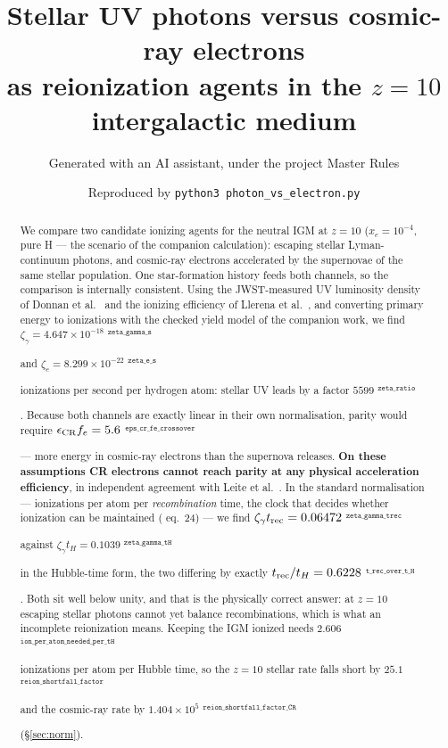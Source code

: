 \documentclass[11pt,a4paper]{article}
\title{Stellar UV photons versus cosmic-ray electrons\\
\large as reionization agents in the $z=10$ intergalactic medium}
\author{Generated with an AI assistant, under the project Master Rules}
\date{Reproduced by \texttt{python3 photon\_vs\_electron.py}}
\newif\ifprovdraft
\newcommand{\src}[1]{%
  \ifprovdraft
    \ifmmode{}^{\text{\color{gray}\scriptsize\texttt{#1}}}%
    \else{\color{gray}\scriptsize$^{\texttt{#1}}$}%
    \fi
  \fi}
\begin{document}
\maketitle

\begin{abstract}
\noindent
We compare two candidate ionizing agents for the neutral IGM at $z=10$
($x_e = 10^{-4}$, pure H --- the scenario of the companion calculation): escaping
stellar Lyman-continuum photons, and cosmic-ray electrons accelerated by the
supernovae of the same stellar population. One star-formation history feeds both
channels, so the comparison is internally consistent. Using the JWST-measured UV
luminosity density of Donnan et al.~\cite{donnan24} and the ionizing efficiency of
Llerena et al.~\cite{llerena25}, and converting primary energy to ionizations with
the checked yield model of the companion work, we find
$\zeta_\gamma = 4.647\times10^{-18}$\src{zeta\_gamma\_s} and
$\zeta_e = 8.299\times10^{-22}$\src{zeta\_e\_s} ionizations per second per
hydrogen atom: stellar UV leads by a factor
$5599$\src{zeta\_ratio}. Because both channels are exactly linear in their own
normalisation, parity would require
$\epsilon_{\rm CR}f_e = 5.6$\src{eps\_cr\_fe\_crossover} --- more energy in
cosmic-ray electrons than the supernova releases. \textbf{On these assumptions CR
electrons cannot reach parity at any physical acceleration efficiency}, in
independent agreement with Leite et al.~\cite{leite17}. In the standard
normalisation --- ionizations per atom per \emph{recombination} time, the clock
that decides whether ionization can be maintained (\cite{md14} eq.~24) --- we
find $\zeta_\gamma t_{\rm rec} = 0.06472$\src{zeta\_gamma\_trec} against
$\zeta_\gamma t_H = 0.1039$\src{zeta\_gamma\_tH} in the Hubble-time form, the two
differing by exactly $t_{\rm rec}/t_H = 0.6228$\src{t\_rec\_over\_t\_H}. Both sit
well below unity, and that is the physically correct answer: at $z=10$ escaping
stellar photons cannot yet balance recombinations, which is what an incomplete
reionization means. Keeping the IGM ionized needs
$2.606$\src{ion\_per\_atom\_needed\_per\_tH} ionizations per atom per Hubble
time, so the $z=10$ stellar rate falls short by
$25.1$\src{reion\_shortfall\_factor} and the cosmic-ray rate by
$1.404\times10^{5}$\src{reion\_shortfall\_factor\_CR} (\S\ref{sec:norm}).
\end{abstract}
\end{document}
